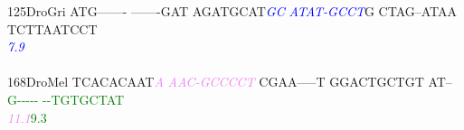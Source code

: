 \documentclass[11pt,twoside,reqno,a4paper]{article}
\begin{document}
{125\hspace*{1\charwidth}DroGri	ATG-------	-------GAT	AGATGCAT\textit{\textcolor{blue}{G}}\textit{\textcolor{blue}{C}}	\textit{\textcolor{blue}{A}}\textit{\textcolor{blue}{T}}\textit{\textcolor{blue}{A}}\textit{\textcolor{blue}{T}}\textit{\textcolor{blue}{-}}\textit{\textcolor{blue}{G}}\textit{\textcolor{blue}{C}}\textit{\textcolor{blue}{C}}\textit{\textcolor{blue}{T}}G	CTAG--ATAA	TCTTAATCCT	\\
\hspace*{4\charwidth}\hspace*{7\charwidth}\hspace*{1\charwidth}\hspace*{1\charwidth}\hspace*{28\charwidth}\textit{\textcolor{blue}{7.9}}\hspace*{1\charwidth}\hspace*{1\charwidth}\hspace*{1\charwidth}\hspace*{1\charwidth}\\
\\
168\hspace*{1\charwidth}DroMel	TCACACAAT\textit{\textcolor{violet}{A}}	\textit{\textcolor{violet}{A}}\textit{\textcolor{violet}{A}}\textit{\textcolor{violet}{C}}\textit{\textcolor{violet}{-}}\textit{\textcolor{violet}{G}}\textit{\textcolor{violet}{C}}\textit{\textcolor{violet}{C}}\textit{\textcolor{violet}{C}}\textit{\textcolor{violet}{C}}\textit{\textcolor{violet}{T}}	CGAA-----T	GGACTGCTGT	AT--\textcolor{green}{G}\textcolor{green}{-}\textcolor{green}{-}\textcolor{green}{-}\textcolor{green}{-}\textcolor{green}{-}	\textcolor{green}{-}\textcolor{green}{-}\textcolor{green}{T}\textcolor{green}{G}\textcolor{green}{T}\textcolor{green}{G}\textcolor{green}{C}\textcolor{green}{T}\textcolor{green}{A}\textcolor{green}{T}	\\
\hspace*{4\charwidth}\hspace*{7\charwidth}\hspace*{9\charwidth}\textit{\textcolor{violet}{11.1}}\hspace*{1\charwidth}\hspace*{1\charwidth}\hspace*{1\charwidth}\hspace*{1\charwidth}\hspace*{31\charwidth}\textcolor{green}{9.3}\hspace*{1\charwidth}\hspace*{1\charwidth}\\
}
\end{document}
